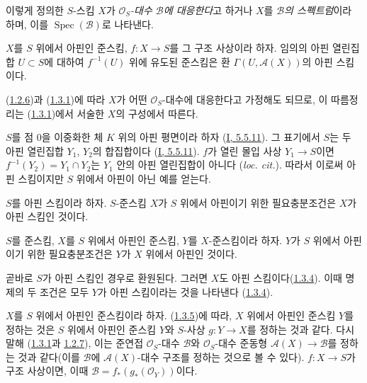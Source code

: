 이렇게 정의한 $S$-스킴 $X$가
\emph{$\mathcal{O}_S$-대수 $\mathcal{B}$에 대응한다}고 하거나
$X$를 \emph{$\mathcal{B}$의 스펙트럼}이라 하며, 이를
$\operatorname{Spec}(\mathcal{B})$로 나타낸다.

\begin{env}[1.3.2]
\label{II.1.3.2-ko}
$X$를 $S$ 위에서 아핀인 준스킴, $f:X\to S$를 그 구조 사상이라
하자. 임의의 아핀 열린집합 $U\subset S$에 대하여
$f^{-1}(U)$ 위에 유도된 준스킴은 환
$\Gamma(U,\mathcal{A}(X))$의 아핀 스킴이다.
\end{env}

(\hyperref[II.1.2.6-ko]{1.2.6})과
(\hyperref[II.1.3.1-ko]{1.3.1})에 따라 $X$가 어떤
$\mathcal{O}_S$-대수에 대응한다고 가정해도 되므로, 이 따름정리는
(\hyperref[II.1.3.1-ko]{1.3.1})에서 서술한 $X$의 구성에서 따른다.

\begin{env}[1.3.3]
\label{II.1.3.3-ko}
$S$를 점 $0$을 이중화한 체 $K$ 위의 아핀 평면이라 하자
(\hyperref[I.5.5.11-ko]{I, 5.5.11}). 그 표기에서 $S$는 두 아핀
열린집합 $Y_1$, $Y_2$의 합집합이다
(\hyperref[I.5.5.11-ko]{I, 5.5.11}). $f$가 열린 몰입 사상
$Y_1\to S$이면
$f^{-1}(Y_2)=Y_1\cap Y_2$는 $Y_1$ 안의 아핀 열린집합이 아니다
(\emph{loc. cit.}). 따라서 이로써 아핀 스킴이지만 $S$ 위에서
아핀이 아닌 예를 얻는다.
\end{env}

\begin{env}[1.3.4]
\label{II.1.3.4-ko}
$S$를 아핀 스킴이라 하자. $S$-준스킴 $X$가 $S$ 위에서
아핀이기 위한 필요충분조건은 $X$가 아핀 스킴인 것이다.
\end{env}

\begin{env}[1.3.5]
\label{II.1.3.5-ko}
$S$를 준스킴, $X$를 $S$ 위에서 아핀인 준스킴, $Y$를
$X$-준스킴이라 하자. $Y$가 $S$ 위에서 아핀이기 위한
필요충분조건은 $Y$가 $X$ 위에서 아핀인 것이다.
\end{env}

곧바로 $S$가 아핀 스킴인 경우로 환원된다. 그러면 $X$도 아핀
스킴이다(\hyperref[II.1.3.4-ko]{1.3.4}). 이때 명제의 두 조건은
모두 $Y$가 아핀 스킴이라는 것을 나타낸다
(\hyperref[II.1.3.4-ko]{1.3.4}).

\begin{env}[1.3.6]
\label{II.1.3.6-ko}
$X$를 $S$ 위에서 아핀인 준스킴이라 하자.
(\hyperref[II.1.3.5-ko]{1.3.5})에 따라, $X$ 위에서 아핀인
준스킴 $Y$를 정하는 것은 $S$ 위에서 아핀인 준스킴 $Y$와
$S$-사상 $g:Y\to X$를 정하는 것과 같다. 다시 말해
(\hyperref[II.1.3.1-ko]{1.3.1}과
\hyperref[II.1.2.7-ko]{1.2.7}), 이는 준연접
$\mathcal{O}_S$-대수 $\mathcal{B}$와 $\mathcal{O}_S$-대수 준동형
$\mathcal{A}(X)\to\mathcal{B}$를 정하는 것과 같다(이를
$\mathcal{B}$에 $\mathcal{A}(X)$-대수 구조를 정하는 것으로 볼 수
있다). $f:X\to S$가 구조 사상이면, 이때
$\mathcal{B}=f_*(g_*(\mathcal{O}_Y))$이다.
\end{env}

